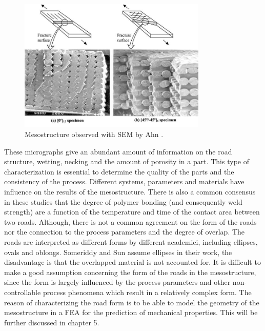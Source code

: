 \begin{figure}[htb]
    \centering
    \includegraphics[width=0.8\textwidth]{chapter_2/figures/AhnMeso.jpg}
    \caption{Mesostructure observed with SEM by Ahn \cite{Ahn2002AnisotropicABS}.}
    \label{fig:AhnMeso}
\end{figure}

These micrographs give an abundant amount of information on the road structure, wetting, necking and the amount of porosity in a part. This type of characterization is essential to determine the quality of the parts and the consistency of the process. Different systems, parameters and materials have influence on the results of the mesostructure. There is also a common consensus in these studies that the degree of polymer bonding (and consequently weld strength) are a function of the temperature and time of the contact area between two roads. Although, there is not a common agreement on the form of the roads nor the connection to the process parameters and the degree of overlap. The roads are interpreted as different forms by different academici, including ellipses, ovals and oblongs. Someriddy \cite{Somireddy2018DevelopmentFDM} and Sun \cite{Sun2008} assume ellipses in their work, the disadvantage is that the overlapped material is not accounted for. 
It is difficult to make a good assumption concerning the form of the roads in the mesostructure, since the form is largely influenced by the process parameters and other non-controllable process phenomena which  result in a relatively complex form. The reason of characterizing the road form is to be able to model the geometry of the mesostructure in a FEA for the prediction of mechanical properties. This will be further discussed in chapter 5. 

